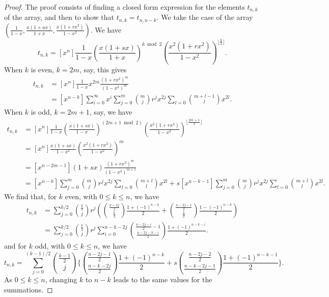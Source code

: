 \documentclass[12pt,reqno]{article}
\theoremstyle{definition}
\begin{document}
\begin{proof} The proof consists of finding a closed form expression for the elements $t_{n,k}$ of the array, and then to show that $t_{n,k}=t_{n,n-k}$. We take the case of the array $\left(\frac{1}{1-x}, \frac{x(1+ax)}{1+x}, \frac{x(1+rx^2)}{1-x^2}\right)$. We have
$$t_{n,k}=[x^n]\frac{1}{1-x}\left(\frac{x(1+sx)}{1+x}\right)^{k \bmod 2}\left(\frac{x^2(1+rx^2)}{1-x^2}\right)^{\lfloor \frac{k}{2} \rfloor}.$$
When $k$ is even, $k=2m$, say, this gives
\begin{align*}
t_{n,k}&=[x^n]\frac{1}{1-x} x^{2m}\frac{(1+rx^2)^m}{(1-x^2)^m}\\
&=[x^{n-k}] \sum_{i=0}^{\infty}x^i \sum_{j=0}^m \binom{m}{j}r^jx^{2j}\sum_{l=0} \binom{m+l-1}{l}x^{2l}.\end{align*}
When $k$ is odd, $k=2m+1$, say, we have
\begin{align*}
t_{n,k}&=[x^n]\frac{1}{1-x}\left(\frac{x(1+sx)}{1-x}\right)^{(2m+1 \bmod 2)}\left(\frac{x^2(1+rx^2)}{1-x^2}\right)^{\lfloor \frac{2m+1}{2} \rfloor}\\
&=[x^n]\frac{x(1+sx)}{1-x^2}\left(\frac{x^2(1+rx^2)}{1-x^2}\right)^m\\
&=[x^{n-2m-1}](1+sx) \frac{(1+rx^2)^m}{(1-x^2)^{m+1}}\\
&=[x^{n-k}] \sum_{j=0}^m \binom{m}{j}r^jx^{2j} \sum_{l=0}\binom{m+l}{l}x^{2l}+s[x^{n-k-1}] \sum_{j=0}^m \binom{m}{j}r^jx^{2j} \sum_{l=0}\binom{m+l}{l}x^{2l}.\end{align*}
We find that, for $k$ even, with $0\le k\le n$, we have
\begin{align*}t_{n,k}&=\sum_{j=0}^{k/2} \binom{\frac{k}{2}}{j}r^j\left(\binom{\frac{n-2j}{2}}{\frac{k}{2}}\frac{1+(-1)^{n-k}}{2}+\binom{\frac{n-2j-1}{2}}{\frac{k}{2}}\frac{1-(-1)^{n-k}}{2}\right)\\
&=\sum_{j=0}^{k/2}\binom{\frac{k}{2}}{j}r^j \sum_{i=0}^{n-k-2j} \binom{\frac{n-2j-i}{2}-1}{\frac{n-2j-k-i}{2}}\frac{1+(-1)^{n-k-i}}{2}.\end{align*}
and for $k$ odd, with $0\le k\le n$, we have
$$t_{n,k}=\sum_{j=0}^{(k-1)/2}\binom{\frac{k-1}{2}}{j}\{\binom{\frac{n-2j-1}{2}}{\frac{n-k-2j}{2}}\frac{1+(-1)^{n-k}}{2}+s\binom{\frac{n-2j-2}{2}}{\frac{n-k-2j-1}{2}}\frac{1+(-1)^{n-k-1}}{2}\}.$$
As $0\le k \le n$, changing $k$ to $n-k$ leads to the same values for the summations.
\end{proof}
\end{document}
